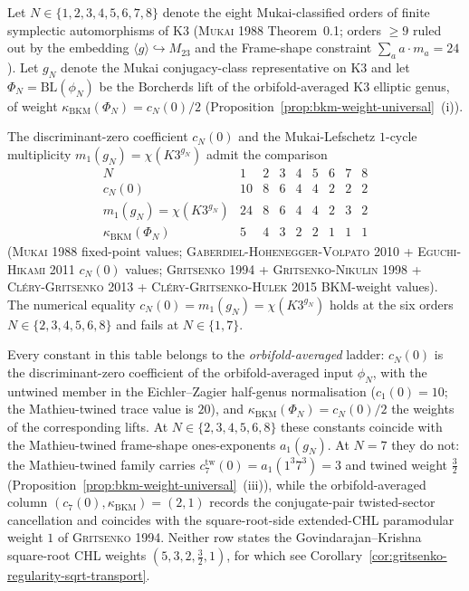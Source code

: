 \begin{proposition}
\label{prop:gritsenko-regularity-criterion}
Let $N \in \{1, 2, 3, 4, 5, 6, 7, 8\}$ denote the eight Mukai-classified
orders of finite symplectic automorphisms of K3 \textup{(}\textsc{Mukai
1988} Theorem~0.1; orders $\ge 9$ ruled out by the embedding
$\langle g \rangle \hookrightarrow M_{23}$ and the Frame-shape
constraint $\sum_a a \cdot m_a = 24$\textup{).} Let $g_N$ denote
the Mukai conjugacy-class representative on K3 and let
$\Phi_N = \mathrm{BL}(\phi_N)$ be the Borcherds lift of the
orbifold-averaged K3 elliptic genus, of weight
$\kappa_{\mathrm{BKM}}(\Phi_N) = c_N(0)/2$
\textup{(}Proposition~\ref{prop:bkm-weight-universal}~(i)\textup{).}

The discriminant-zero coefficient $c_N(0)$ and the Mukai-Lefschetz
$1$-cycle multiplicity $m_1(g_N) = \chi(K3^{g_N})$ admit the comparison
\[
 \begin{array}{c|cccccccc}
 N & 1 & 2 & 3 & 4 & 5 & 6 & 7 & 8 \\ \hline
 c_N(0) & 10 & 8 & 6 & 4 & 4 & 2 & 2 & 2 \\
 m_1(g_N) = \chi(K3^{g_N}) & 24 & 8 & 6 & 4 & 4 & 2 & 3 & 2 \\
 \kappa_{\mathrm{BKM}}(\Phi_N) & 5 & 4 & 3 & 2 & 2 & 1 & 1 & 1
 \end{array}
\]
\textup{(}\textsc{Mukai 1988} fixed-point values;
\textsc{Gaberdiel-Hohenegger-Volpato 2010} + \textsc{Eguchi-Hikami 2011}
$c_N(0)$ values; \textsc{Gritsenko 1994} + \textsc{Gritsenko-Nikulin 1998}
+ \textsc{Cl\'ery-Gritsenko 2013} + \textsc{Cl\'ery-Gritsenko-Hulek 2015}
BKM-weight values\textup{).}
The numerical equality $c_N(0) = m_1(g_N) = \chi(K3^{g_N})$ holds at the
six orders $N \in \{2, 3, 4, 5, 6, 8\}$ and fails at $N \in \{1, 7\}$.

Every constant in this table belongs to the \emph{orbifold-averaged}
ladder: $c_N(0)$ is the discriminant-zero coefficient of the
orbifold-averaged input $\phi_N$, with the untwined member in the
Eichler--Zagier half-genus normalisation \textup{(}$c_1(0) = 10$; the
Mathieu-twined trace value is $20$\textup{)}, and
$\kappa_{\mathrm{BKM}}(\Phi_N) = c_N(0)/2$ the weights of the
corresponding lifts. At $N \in \{2, 3, 4, 5, 6, 8\}$ these constants
coincide with the Mathieu-twined frame-shape ones-exponents
$a_1(g_N)$. At $N = 7$ they do not: the Mathieu-twined family carries
$c^{\mathrm{tw}}_7(0) = a_1(1^3 7^3) = 3$ and twined weight
$\tfrac32$ \textup{(}Proposition~\ref{prop:bkm-weight-universal}~(iii)\textup{)},
while the orbifold-averaged column $(c_7(0), \kappa_{\mathrm{BKM}}) =
(2, 1)$ records the conjugate-pair twisted-sector cancellation and
coincides with the square-root-side extended-CHL paramodular weight
$1$ of \textsc{Gritsenko 1994}. Neither row states the
Govindarajan--Krishna square-root CHL weights $(5, 3, 2, \tfrac32, 1)$,
for which see
Corollary~\ref{cor:gritsenko-regularity-sqrt-transport}.


\end{proposition}
